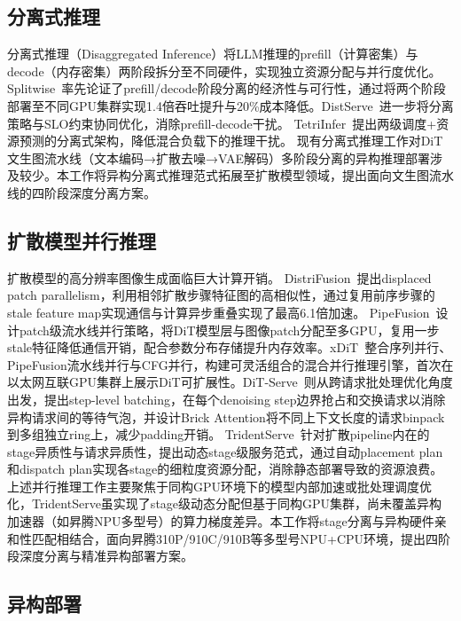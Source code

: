 \documentclass{ctexart}
\begin{document}
\subsection{分离式推理}

分离式推理（Disaggregated Inference）将LLM推理的prefill（计算密集）与decode（内存密集）两阶段拆分至不同硬件，实现独立资源分配与并行度优化。Splitwise~\cite{SplitwiseEfficientGenerativePatel2024}率先论证了prefill/decode阶段分离的经济性与可行性，通过将两个阶段部署至不同GPU集群实现1.4倍吞吐提升与20\%成本降低。DistServe~\cite{DistServeDisaggregatingPrefillZhong2024}进一步将分离策略与SLO约束协同优化，消除prefill-decode干扰。
TetriInfer~\cite{InferenceInterferenceDisaggregateHu2024}提出两级调度+资源预测的分离式架构，降低混合负载下的推理干扰。
现有分离式推理工作对DiT文生图流水线（文本编码→扩散去噪→VAE解码）多阶段分离的异构推理部署涉及较少。本工作将异构分离式推理范式拓展至扩散模型领域，提出面向文生图流水线的四阶段深度分离方案。

\subsection{扩散模型并行推理}

扩散模型的高分辨率图像生成面临巨大计算开销。
DistriFusion~\cite{DistriFusionDistributedParallelLi2024}提出displaced patch parallelism，利用相邻扩散步骤特征图的高相似性，通过复用前序步骤的stale feature map实现通信与计算异步重叠实现了最高6.1倍加速。
PipeFusion~\cite{PipeFusionPatchlevelPipelineFang2025}设计patch级流水线并行策略，将DiT模型层与图像patch分配至多GPU，复用一步stale特征降低通信开销，配合参数分布存储提升内存效率。xDiT~\cite{XDiTInferenceEngineFang2024}整合序列并行、PipeFusion流水线并行与CFG并行，构建可灵活组合的混合并行推理引擎，首次在以太网互联GPU集群上展示DiT可扩展性。DiT-Serve~\cite{DiTServeEfficientServingLuo2025}则从跨请求批处理优化角度出发，提出step-level batching，在每个denoising step边界抢占和交换请求以消除异构请求间的等待气泡，并设计Brick Attention将不同上下文长度的请求binpack到多组独立ring上，减少padding开销。
TridentServe~\cite{TridentServeStagelevelServingXia2025}针对扩散pipeline内在的stage异质性与请求异质性，提出动态stage级服务范式，通过自动placement plan和dispatch plan实现各stage的细粒度资源分配，消除静态部署导致的资源浪费。
上述并行推理工作主要聚焦于同构GPU环境下的模型内部加速或批处理调度优化，TridentServe虽实现了stage级动态分配但基于同构GPU集群，尚未覆盖异构加速器（如昇腾NPU多型号）的算力梯度差异。本工作将stage分离与异构硬件亲和性匹配相结合，面向昇腾310P/910C/910B等多型号NPU+CPU环境，提出四阶段深度分离与精准异构部署方案。
\subsection{异构部署}
\end{document}
